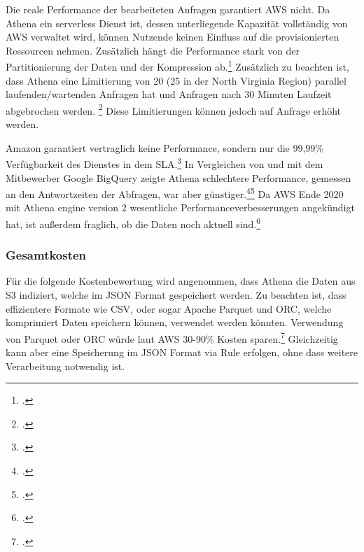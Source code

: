 Die reale Performance der bearbeiteten Anfragen garantiert \ac{AWS} nicht. Da Athena ein serverless Dienst ist, dessen unterliegende Kapazität vollständig von \ac{AWS} verwaltet wird, können Nutzende keinen Einfluss auf die provisionierten Ressourcen nehmen. Zusätzlich hängt die Performance stark von der Partitionierung der Daten und der Kompression ab.\footcite[Vgl.][]{Levy.2021} Zusätzlich zu beachten ist, dass Athena eine Limitierung von 20 (25 in der North Virginia Region) parallel laufenden/wartenden Anfragen hat und Anfragen nach 30 Minuten Laufzeit abgebrochen werden. \footcite[Vgl. auch im Folgenden][]{AmazonWebServicesInc..o.J.ac} Diese Limitierungen können jedoch auf Anfrage erhöht werden.

Amazon garantiert vertraglich keine Performance, sondern nur die 99,99\% Verfügbarkeit des Dienstes in dem \ac{SLA}.\footcite[Vgl.][]{AmazonWebServicesInc..2019c} In Vergleichen von \citeauthor{Levy.2019} und \citeauthor{Khadtare.2018} mit dem Mitbewerber Google BigQuery zeigte Athena schlechtere Performance, gemessen an den Antwortzeiten der Abfragen, war aber günstiger.\footcite[Vgl.][]{Levy.2019}\nzitat\footcite[Vgl.][]{Khadtare.2018} Da \ac{AWS} Ende 2020 mit Athena engine version 2 wesentliche Performanceverbesserungen angekündigt hat, ist außerdem fraglich, ob die Daten noch aktuell sind.\footcite[Vgl.][]{AmazonWebServicesInc..2020c}

\subsubsection{Gesamtkosten}
Für die folgende Kostenbewertung wird angenommen, dass Athena die Daten aus \ac{S3} indiziert, welche im \ac{JSON} Format gespeichert werden. Zu beachten ist, dass effizientere Formate wie CSV, oder sogar Apache Parquet und ORC, welche komprimiert Daten speichern können, verwendet werden  könnten. Verwendung von Parquet oder ORC würde laut \ac{AWS} 30-90\% Kosten sparen.\footcite[Vgl.][]{AmazonWebServicesInc..o.J.t} Gleichzeitig kann aber eine Speicherung im \ac{JSON} Format via \AWSIOT{} Rule erfolgen, ohne dass weitere Verarbeitung notwendig ist.


